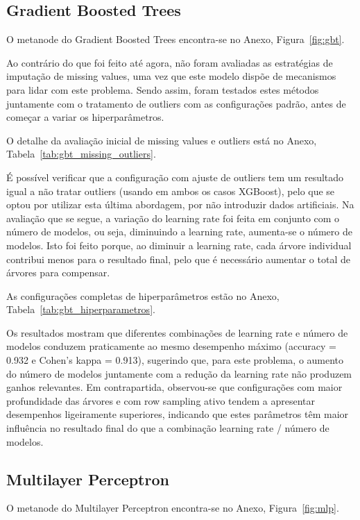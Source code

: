 \documentclass[11pt,a4paper]{article}
\begin{document}
\subsection{Gradient Boosted Trees}

O metanode do Gradient Boosted Trees encontra-se no Anexo, Figura~\ref{fig:gbt}.

Ao contrário do que foi feito até agora, não foram avaliadas as estratégias de imputação de missing values, uma vez que este modelo dispõe de mecanismos para lidar com este problema. Sendo assim, foram testados estes métodos juntamente com o tratamento de outliers com as configurações padrão, antes de começar a variar os hiperparâmetros.

O detalhe da avaliação inicial de missing values e outliers está no Anexo, Tabela~\ref{tab:gbt_missing_outliers}.

É possível verificar que a configuração com ajuste de outliers tem um resultado igual a não tratar outliers (usando em ambos os casos XGBoost), pelo que se optou por utilizar esta última abordagem, por não introduzir dados artificiais.
Na avaliação que se segue, a variação do learning rate foi feita em conjunto com o número de modelos, ou seja, diminuindo a learning rate, aumenta-se o número de modelos. Isto foi feito porque, ao diminuir a learning rate, cada árvore individual contribui menos para o resultado final, pelo que é necessário aumentar o total de árvores para compensar.

As configurações completas de hiperparâmetros estão no Anexo, Tabela~\ref{tab:gbt_hiperparametros}.

Os resultados mostram que diferentes combinações de learning rate e número de modelos conduzem praticamente ao mesmo desempenho máximo (accuracy = 0.932 e Cohen's kappa = 0.913), sugerindo que, para este problema, o aumento do número de modelos juntamente com a redução da learning rate não produzem ganhos relevantes. Em contrapartida, observou-se que configurações com maior profundidade das árvores e com row sampling ativo tendem a apresentar desempenhos ligeiramente superiores, indicando que estes parâmetros têm maior influência no resultado final do que a combinação learning rate / número de modelos.

\subsection{Multilayer Perceptron}

O metanode do Multilayer Perceptron encontra-se no Anexo, Figura~\ref{fig:mlp}.
\end{document}

